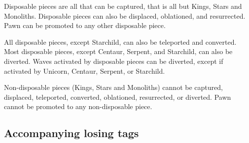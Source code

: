 
Disposable pieces are all that can be captured, that is all but Kings, Stars and
Monoliths. Disposable pieces can also be displaced, oblationed, and resurrected.
Pawn can be promoted to any other disposable piece.

All disposable pieces, except Starchild, can also be teleported and converted.
Most disposable pieces, except Centaur, Serpent, and Starchild, can also be
diverted. Waves activated by disposable pieces can be diverted, except if
activated by Unicorn, Centaur, Serpent, or Starchild.

Non-disposable pieces (Kings, Stars and Monoliths) cannot be captured, displaced,
teleported, converted, oblationed, resurrected, or diverted. Pawn cannot be
promoted to any non-disposable piece.

\clearpage %

\subsection*{Accompanying losing tags}
\label{sec:Appendix/Summary/Accompanying-losing-tags}

